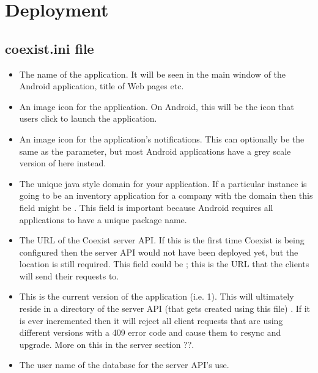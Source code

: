 \section{Deployment} \label{sec:deployment}



\subsection{coexist.ini file}  \label{sec:ini}



\begin{itemize}
\item {} The name of the application. It will be seen in the main window of the Android application, title of Web pages etc.
\item {} An image icon for the application. On Android, this will be the icon that users click to launch the application.
\item {} An image icon for the application's notifications. This can optionally be the same as the  parameter, but most Android applications have a grey scale version of  here instead.
\item {} The unique java style domain for your application. If a particular instance is going to be an inventory application for a company with the domain  then this field might be . This field is important because Android requires all applications to have a unique package name. 
\item {} The URL of the Coexist server API. If this is the first time Coexist is being configured then the server API would not have been deployed yet, but the location is still required. This field could be ; this is the URL that the clients will send their requests to. 
\item {} This is the current version of the application (i.e. 1). This will ultimately reside in a directory of the server API (that gets created using this file) . If it is ever incremented then it will reject all client requests that are using different versions with a 409 error code and cause them to resync and upgrade. More on this in the server section ??.
\item {} The user name of the database for the server API's use.

\end{itemize}
